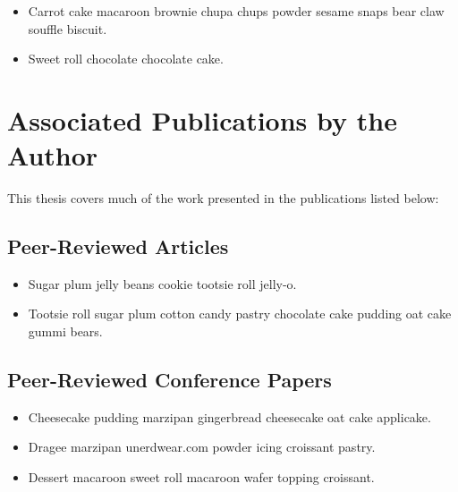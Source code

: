 \begin{itemize}
  \onehalfspacing
\item Carrot cake macaroon brownie chupa chups powder sesame snaps bear claw souffle biscuit.
\item Sweet roll chocolate chocolate cake.
\end{itemize}

\section{Associated Publications by the Author}

This thesis covers much of the work presented in the publications listed below:

\subsection{Peer-Reviewed Articles}
\renewcommand{\thefootnote}{\fnsymbol{footnote}}
\vspace{1em}
\begin{itemize}
\onehalfspacing
\item Sugar plum jelly beans cookie tootsie roll jelly-o.
\item Tootsie roll sugar plum cotton candy pastry chocolate cake pudding oat cake gummi bears.
\end{itemize}

\subsection{Peer-Reviewed Conference Papers}
\vspace{1em}
\begin{itemize}
\onehalfspacing
\item Cheesecake pudding marzipan gingerbread cheesecake oat cake applicake.
\item  Dragee marzipan unerdwear.com powder icing croissant pastry.
\item  Dessert macaroon sweet roll macaroon wafer topping croissant.

\end{itemize}

